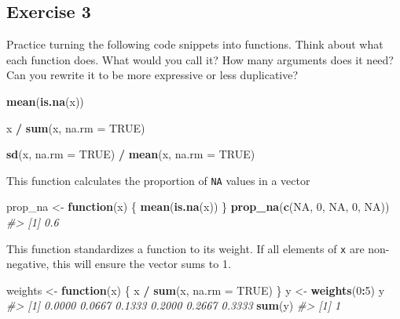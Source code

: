 \documentclass[]{book}
\newenvironment{Shaded}{\begin{snugshade}}{\end{snugshade}}
\newcommand{\CommentTok}[1]{\textcolor[rgb]{0.56,0.35,0.01}{\textit{#1}}}
\newcommand{\ControlFlowTok}[1]{\textcolor[rgb]{0.13,0.29,0.53}{\textbf{#1}}}
\newcommand{\DataTypeTok}[1]{\textcolor[rgb]{0.13,0.29,0.53}{#1}}
\newcommand{\DecValTok}[1]{\textcolor[rgb]{0.00,0.00,0.81}{#1}}
\newcommand{\KeywordTok}[1]{\textcolor[rgb]{0.13,0.29,0.53}{\textbf{#1}}}
\newcommand{\NormalTok}[1]{#1}
\newcommand{\OperatorTok}[1]{\textcolor[rgb]{0.81,0.36,0.00}{\textbf{#1}}}
\newcommand{\OtherTok}[1]{\textcolor[rgb]{0.56,0.35,0.01}{#1}}
\newcommand{\StringTok}[1]{\textcolor[rgb]{0.31,0.60,0.02}{#1}}
\theoremstyle{definition}
\theoremstyle{definition}
\theoremstyle{definition}
\theoremstyle{remark}
\begin{document}
\hypertarget{exercise-3-31}{%
\subsection{Exercise 3}\label{exercise-3-31}}

Practice turning the following code snippets into functions. Think about
what each function does. What would you call it? How many arguments does
it need? Can you rewrite it to be more expressive or less duplicative?

\begin{Shaded}
\begin{Highlighting}[]
\KeywordTok{mean}\NormalTok{(}\KeywordTok{is.na}\NormalTok{(x))}

\NormalTok{x }\OperatorTok{/}\StringTok{ }\KeywordTok{sum}\NormalTok{(x, }\DataTypeTok{na.rm =} \OtherTok{TRUE}\NormalTok{)}

\KeywordTok{sd}\NormalTok{(x, }\DataTypeTok{na.rm =} \OtherTok{TRUE}\NormalTok{) }\OperatorTok{/}\StringTok{ }\KeywordTok{mean}\NormalTok{(x, }\DataTypeTok{na.rm =} \OtherTok{TRUE}\NormalTok{)}
\end{Highlighting}
\end{Shaded}

This function calculates the proportion of \texttt{NA} values in a
vector

\begin{Shaded}
\begin{Highlighting}[]
\NormalTok{prop_na <-}\StringTok{ }\ControlFlowTok{function}\NormalTok{(x) \{}
  \KeywordTok{mean}\NormalTok{(}\KeywordTok{is.na}\NormalTok{(x))}
\NormalTok{\}}
\KeywordTok{prop_na}\NormalTok{(}\KeywordTok{c}\NormalTok{(}\OtherTok{NA}\NormalTok{, }\DecValTok{0}\NormalTok{, }\OtherTok{NA}\NormalTok{, }\DecValTok{0}\NormalTok{, }\OtherTok{NA}\NormalTok{))}
\CommentTok{#> [1] 0.6}
\end{Highlighting}
\end{Shaded}

This function standardizes a function to its weight. If all elements of
\texttt{x} are non-negative, this will ensure the vector sums to 1.

\begin{Shaded}
\begin{Highlighting}[]
\NormalTok{weights <-}\StringTok{ }\ControlFlowTok{function}\NormalTok{(x) \{}
\NormalTok{  x }\OperatorTok{/}\StringTok{ }\KeywordTok{sum}\NormalTok{(x, }\DataTypeTok{na.rm =} \OtherTok{TRUE}\NormalTok{)}
\NormalTok{\}}
\NormalTok{y <-}\StringTok{ }\KeywordTok{weights}\NormalTok{(}\DecValTok{0}\OperatorTok{:}\DecValTok{5}\NormalTok{)}
\NormalTok{y}
\CommentTok{#> [1] 0.0000 0.0667 0.1333 0.2000 0.2667 0.3333}
\KeywordTok{sum}\NormalTok{(y)}
\CommentTok{#> [1] 1}
\end{Highlighting}
\end{Shaded}
\end{document}
